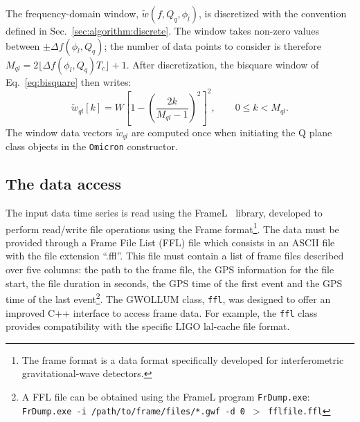 The frequency-domain window, $\tilde{w}(f,Q_q, \phi_l)$, is discretized with the convention defined in Sec.~\ref{sec:algorithm:discrete}. The window takes non-zero values between $\pm \Delta f(\phi_l,Q_q)$; the number of data points to consider is therefore $M_{ql}=2\lfloor \Delta f(\phi_l,Q_q) T_c \rfloor + 1$. After discretization, the bisquare window of Eq.~\ref{eq:bisquare} then writes:
\begin{equation}
  \tilde{w}_{ql}[k] = W \left[1 - \left(\frac{2k}{M_{ql}-1}\right)^2 \right]^2, \qquad 0\le k < M_{ql}.
  \label{eq:dbisquare}
\end{equation}
The window data vectors $\tilde{w}_{ql}$ are computed once when initiating the Q plane class objects in the \texttt{Omicron} constructor.




\subsection{The data access} \label{sec:algorithm:data}
The input data time series is read using the FrameL~\cite{FrameL} library, developed to perform read/write file operations using the Frame format\footnote{The frame format is a data format specifically developed for interferometric gravitational-wave detectors.}. The data must be provided through a Frame File List (FFL) file which consists in an ASCII file with the file extension ``.ffl''. This file must contain a list of frame files described over five columns: the path to the frame file, the GPS information for the file start, the file duration in seconds, the GPS time of the first event and the GPS time of the last event\footnote{A FFL file can be obtained using the FrameL program \texttt{FrDump.exe}: \texttt{FrDump.exe -i /path/to/frame/files/*.gwf -d 0 $>$ fflfile.ffl}}. The GWOLLUM class, \texttt{ffl}, was designed to offer an improved C++ interface to access frame data. For example, the \texttt{ffl} class provides compatibility with the specific LIGO lal-cache file format.

